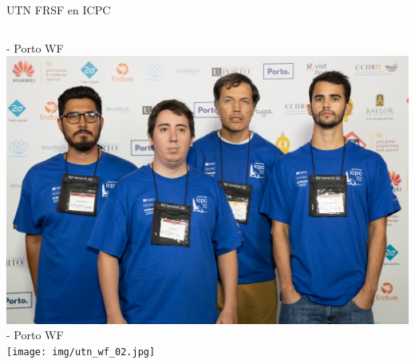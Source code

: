 \documentclass{beamer}
\begin{document}
\begin{frame}{UTN FRSF en ICPC}
    \begin{columns}[t]
         - Porto WF\\
        \includegraphics[width=1\textwidth]{img/utn_wf_01.jpg}
         - Porto WF\\
        \texttt{[image: img/utn\_wf\_02.jpg]}
    \end{columns}
\end{frame}
\end{document}
